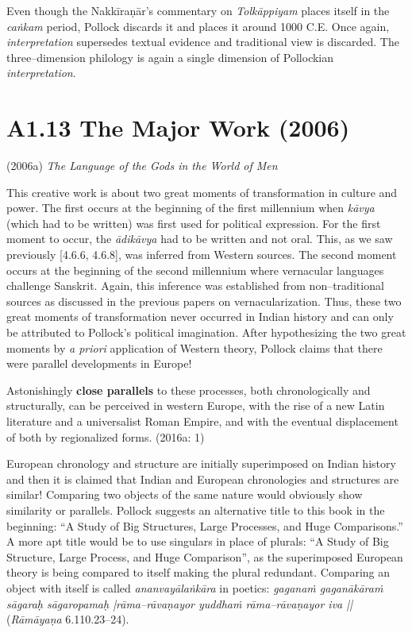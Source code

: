 Even though the Nakkīraṇār’s commentary on \textit{Tolkāppiyam }places itself in the \textit{caṅkam} period, Pollock discards it and places it around 1000 C.E. Once again, \textit{interpretation} supersedes textual evidence and traditional view is discarded. The three–dimension philology is again a single dimension of Pollockian \textit{interpretation}.


\vspace{-.3cm}

\section*{A1.13 The Major Work (2006)}

(2006a)\textit{ The Language of the Gods in the World of Men}

This creative work is about two great moments of transformation in culture and power. The first occurs at the beginning of the first millennium when \textit{kāvya }(which had to be written) was first used for political expression. For the first moment to occur, the\textit{ ādikāvya }had to be written and not oral. This, as we saw previously [4.6.6, 4.6.8], was inferred from Western sources. The second moment occurs at the beginning of the second millennium where vernacular languages challenge Sanskrit. Again, this inference was established from non–traditional sources as discussed in the previous papers on vernacularization. Thus, these two great moments of transformation never occurred in Indian history and can only be attributed to Pollock’s political imagination. After hypothesizing the two great moments by \textit{a priori} application of Western theory, Pollock claims that there were parallel developments in Europe!

\begin{myquote}
Astonishingly \textbf{close parallels} to these processes, both chronologically and structurally, can be perceived in western Europe, with the rise of a new Latin literature and a universalist Roman Empire, and with the eventual displacement of both by regionalized forms. (2016a: 1)
\end{myquote}

European chronology and structure are initially superimposed on Indian history and then it is claimed that Indian and European chronologies and structures are similar! Comparing two objects of the same nature would obviously show similarity or parallels. Pollock suggests an alternative title to this book in the beginning: “A Study of Big Structures, Large Processes, and Huge Comparisons.” A more apt title would be to use singulars in place of plurals: “A Study of Big Structure, Large Process, and Huge Comparison”, as the superimposed European theory is being compared to itself making the plural redundant. Comparing an object with itself is called \textit{ananvayālaṅkāra} in poetics: \textit{gaganaṁ gaganākāraṁ sāgaraḥ sāgaropamaḥ |rāma–rāvaṇayor yuddhaṁ rāma–rāvaṇayor iva || }(\textit{Rāmāyaṇa} 6.110.23–24).

